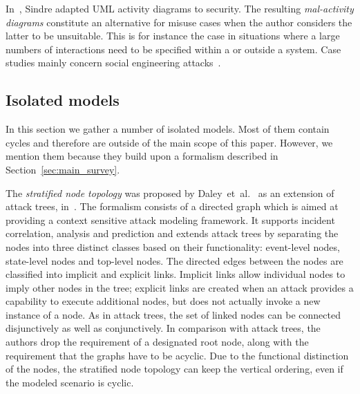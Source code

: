 \documentclass[a4paper]{article}
\begin{document}
In~\cite{Sind}, Sindre adapted UML activity diagrams to security. The resulting 
\emph{mal-activity diagrams} constitute an alternative for misuse cases when 
the author considers the latter to be unsuitable. This is for instance the case 
in situations where a large numbers of interactions need to be specified within 
a or outside a system. Case studies mainly concern social engineering 
attacks~\cite{KarpatiIJSSE12}. 

\subsection{Isolated models}
\label{sec:isolated_models}

In this section we gather a number of isolated models. Most of them contain 
cycles and therefore are outside of the main scope of this paper. However, we
mention them because they build upon a formalism described in 
Section~\ref{sec:main_survey}.

The \emph{stratified node topology} was proposed by Daley~et~al.~\cite{DaLaDa} 
as an extension of attack trees, in~. The  formalism consists of a
directed graph which is aimed at providing a context  sensitive attack modeling
framework. It supports incident correlation, analysis  and prediction and
extends attack trees by separating the nodes into three  distinct classes based
on their functionality: event-level nodes,  state-level nodes and top-level
nodes. The directed edges between the nodes are  classified into implicit and
explicit links. Implicit links allow individual  nodes to imply other nodes in
the tree; explicit links are created when an  attack provides a capability to
execute additional nodes, but does not actually  invoke a new instance of a
node. As in attack trees, the set of linked nodes  can be connected
disjunctively as well as conjunctively. In comparison with  attack trees, the
authors drop the requirement of a designated root node, along  with the
requirement that the graphs have to be acyclic. Due to the functional 
distinction of the nodes, the stratified node topology can keep the vertical 
ordering, even if the modeled scenario is cyclic.
\end{document}
